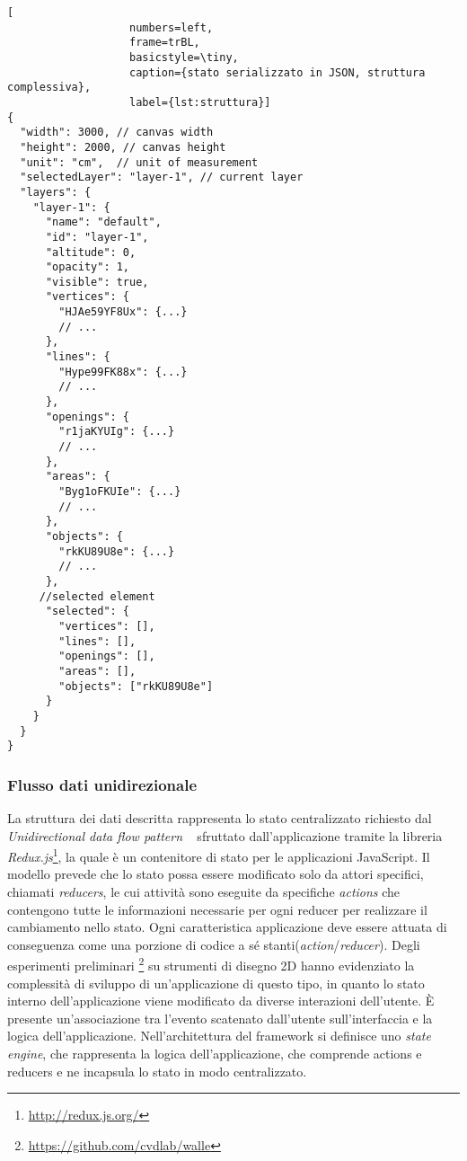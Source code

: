 \begin{lstlisting}[
                   numbers=left,
                   frame=trBL,
                   basicstyle=\tiny,
                   caption={stato serializzato in JSON, struttura complessiva},
                   label={lst:struttura}]
{
  "width": 3000, // canvas width
  "height": 2000, // canvas height
  "unit": "cm",  // unit of measurement
  "selectedLayer": "layer-1", // current layer
  "layers": {
    "layer-1": {
      "name": "default",
      "id": "layer-1",
      "altitude": 0,
      "opacity": 1,
      "visible": true,
      "vertices": {
        "HJAe59YF8Ux": {...}
        // ...
      },
      "lines": {
        "Hype99FK88x": {...}
        // ...
      },
      "openings": {
        "r1jaKYUIg": {...}
        // ...
      },
      "areas": {
        "Byg1oFKUIe": {...}
        // ...
      },
      "objects": {
        "rkKU89U8e": {...}
        // ...
      },
     //selected element
      "selected": {
        "vertices": [],
        "lines": [],
        "openings": [],
        "areas": [],
        "objects": ["rkKU89U8e"]
      }
    }
  }
}
\end{lstlisting}
\newpage

\subsubsection*{Flusso dati unidirezionale}
\noindent
La struttura dei dati descritta rappresenta lo stato centralizzato richiesto dal \emph{Unidirectional data flow pattern}
~\cite{uniflow} sfruttato dall'applicazione tramite la libreria \emph{Redux.js}\footnote{\url{http://redux.js.org/}},
la quale è un contenitore di stato per le applicazioni JavaScript.
Il modello prevede che lo stato possa essere modificato solo da attori specifici, chiamati \emph{reducers},
le cui attività sono eseguite da specifiche \emph{actions} che contengono tutte le informazioni necessarie per
ogni reducer per realizzare il cambiamento nello stato. Ogni caratteristica applicazione deve essere attuata di conseguenza
come una porzione di codice a sé stanti(\emph{action}/\emph{reducer}).
Degli esperimenti preliminari \footnote{\url{https://github.com/cvdlab/walle}} su strumenti di disegno 2D
hanno evidenziato la complessità di sviluppo di un'applicazione di questo tipo, in quanto
lo stato interno dell'applicazione viene modificato da diverse interazioni dell'utente.
\`E presente un'associazione tra l'evento scatenato dall'utente sull'interfaccia e la logica dell'applicazione.
Nell'architettura del framework si definisce uno \emph{state engine}, che rappresenta la logica dell'applicazione,
che comprende actions e reducers e ne incapsula lo stato in modo centralizzato.
\newpage

